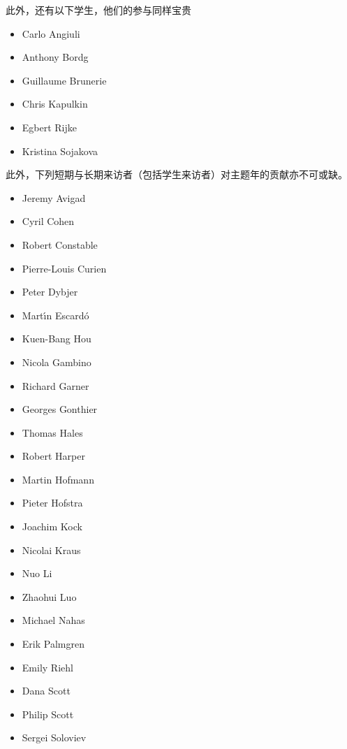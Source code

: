\noindent 此外，还有以下学生，他们的参与同样宝贵

\begin{multicols}{\OPTprefacecols}{
\begin{itemize}
\item[] Carlo Angiuli
\item[] Anthony Bordg
\item[] Guillaume Brunerie
\item[] Chris Kapulkin
\item[] Egbert Rijke
\item[] Kristina Sojakova
\end{itemize}
}
\end{multicols}

\noindent 此外，下列短期与长期来访者（包括学生来访者）对主题年的贡献亦不可或缺。

\begin{multicols}{\OPTprefacecols}{
\begin{itemize}
\item[] Jeremy Avigad
\item[] Cyril Cohen
\item[] Robert Constable
\item[] Pierre-Louis Curien
\item[] Peter Dybjer
\item[] Mart{\'\i}n Escard{\'o}
\item[] Kuen-Bang Hou
\item[] Nicola Gambino
\item[] Richard Garner
\item[] Georges Gonthier
\item[] Thomas Hales
\item[] Robert Harper
\item[] Martin Hofmann
\item[] Pieter Hofstra
\item[] Joachim Kock
\item[] Nicolai Kraus
\item[] Nuo Li
\item[] Zhaohui Luo
\item[] Michael Nahas
\item[] Erik Palmgren
\item[] Emily Riehl
\item[] Dana Scott
\item[] Philip Scott
\item[] Sergei Soloviev
\end{itemize}
}
\end{multicols}

